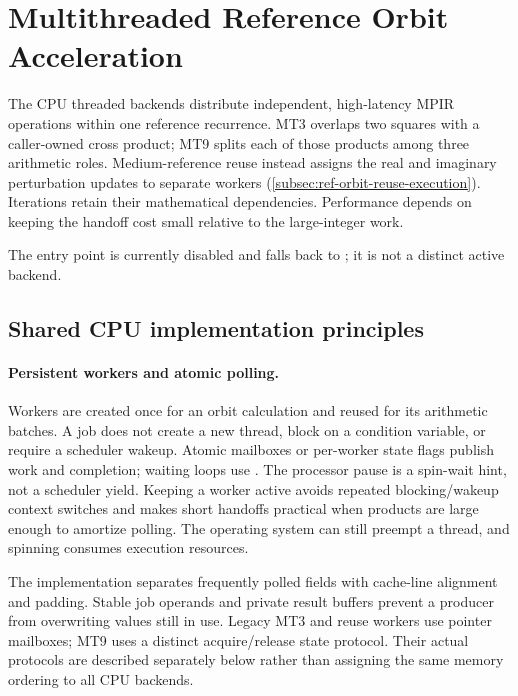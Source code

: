 \section{Multithreaded Reference Orbit Acceleration}
\label{subsec:ref-orbit-mt}

The CPU threaded backends distribute independent, high-latency MPIR operations
within one reference recurrence. MT3 overlaps two squares with a caller-owned
cross product; MT9 splits each of those products among three arithmetic roles.
Medium-reference reuse instead assigns the real and imaginary perturbation
updates to separate workers (\cref{subsec:ref-orbit-reuse-execution}). Iterations
retain their mathematical dependencies. Performance depends on keeping the
handoff cost small relative to the large-integer work.

The  entry point is currently disabled and falls back to ;
it is not a distinct active backend.

\subsection{Shared CPU implementation principles}
\label{subsec:ref-orbit-cpu-principles}

\paragraph{Persistent workers and atomic polling.}
Workers are created once for an orbit calculation and reused for its arithmetic
batches. A job does not create a new thread, block on a condition variable, or
require a scheduler wakeup. Atomic mailboxes or per-worker state flags publish
work and completion; waiting loops use . The processor pause
is a spin-wait hint, not a scheduler yield. Keeping a worker active avoids
repeated blocking/wakeup context switches and makes short handoffs practical
when products are large enough to amortize polling. The operating system can
still preempt a thread, and spinning consumes execution resources.

The implementation separates frequently polled fields with cache-line alignment
and padding. Stable job operands and private result buffers prevent a producer
from overwriting values still in use. Legacy MT3 and reuse workers use pointer
mailboxes; MT9 uses a distinct acquire/release state protocol. Their actual
protocols are described separately below rather than assigning the same memory
ordering to all CPU backends.

